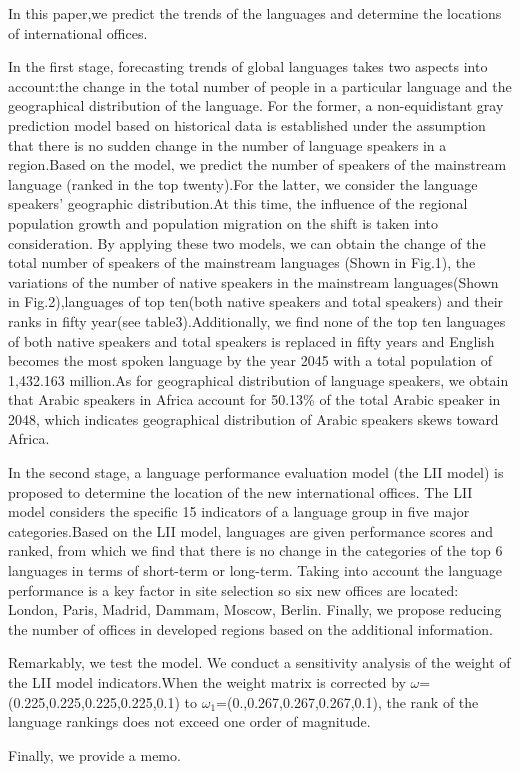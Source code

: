 \noindent In this paper,we predict the trends of the languages and determine the locations of international offices.
\par In the first stage, forecasting trends of global languages takes two aspects into account:the change in the total number of people in a particular language and the geographical distribution of the language. For the former, a non-equidistant gray prediction model based on historical data is established under the assumption that there is no sudden change in the number of language speakers in a region.Based on the model, we predict the number of speakers of the mainstream language (ranked in the top twenty).For the latter, we consider the language speakers' geographic distribution.At this time, the influence of the regional population growth and population migration on the shift is taken into consideration. By applying these two models, we can obtain the change of the total number of speakers of the mainstream languages (Shown in Fig.1), the variations of the number of native speakers in the mainstream languages(Shown in Fig.2),languages of top ten(both native speakers and total speakers) and their ranks in fifty year(see table3).Additionally, we find none of the top ten languages of both native speakers and total speakers is replaced in fifty years and English becomes the most spoken language by the year 2045 with a total population of 1,432.163 million.As for geographical distribution of language speakers, we obtain that Arabic speakers in Africa account for 50.13\% of the total Arabic speaker in 2048, which indicates geographical distribution of Arabic speakers skews toward Africa.
\par In the second stage, a language performance evaluation model (the LII model) is proposed to determine the location of the new international offices. The LII model considers the specific 15 indicators of a language group in five major categories.Based on the LII model, languages are given performance scores and ranked, from which we find that there is no change in the categories of the top 6 languages in terms of short-term or long-term. Taking into account the language performance is a key factor in site selection so six new offices are located: London, Paris, Madrid, Dammam, Moscow, Berlin. Finally, we propose reducing the number of offices in developed regions based on the additional information.
\par Remarkably, we test the model. We conduct a sensitivity analysis of the weight of the LII model indicators.When the weight matrix is corrected by $\omega $=\\(0.225,0.225,0.225,0.225,0.1) to ${\omega _1}$=(0.,0.267,0.267,0.267,0.1), the rank of the language rankings does not exceed one order of magnitude.
\par Finally, we provide a memo.



